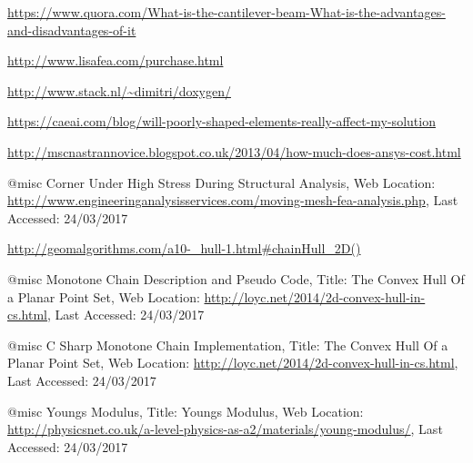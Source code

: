 \begin{changemargin}{\CMwidth}{\CMheight}
\begin{thebibliography}{9}
 \url{https://www.quora.com/What-is-the-cantilever-beam-What-is-the-advantages-and-disadvantages-of-it}

 \url{http://www.lisafea.com/purchase.html}

 \url{http://www.stack.nl/~dimitri/doxygen/} 

 \url{https://caeai.com/blog/will-poorly-shaped-elements-really-affect-my-solution}

  

 \url{http://mscnastrannovice.blogspot.co.uk/2013/04/how-much-does-ansys-cost.html}


 @misc{ Corner Under High Stress During Structural Analysis,
  {Web Location: \url{http://www.engineeringanalysisservices.com/moving-mesh-fea-analysis.php}},
 {Last Accessed: 24/03/2017}}
 
 
 \url{http://geomalgorithms.com/a10-_hull-1.html#chainHull_2D()}


 @misc{ Monotone Chain Description and Pseudo Code,
  {Title: The Convex Hull Of a Planar Point Set},
  {Web Location: \url{http://loyc.net/2014/2d-convex-hull-in-cs.html}},
  {Last Accessed: 24/03/2017}}
  
  


 @misc{ C Sharp Monotone Chain Implementation,
  {Title: The Convex Hull Of a Planar Point Set},
  {Web Location: \url{http://loyc.net/2014/2d-convex-hull-in-cs.html}},
  {Last Accessed: 24/03/2017}}
  


 @misc{ Youngs Modulus,
  {Title: Youngs Modulus},
  {Web Location: \url{http://physicsnet.co.uk/a-level-physics-as-a2/materials/young-modulus/}},
  {Last Accessed: 24/03/2017}}


\end{thebibliography}
\end{changemargin}
